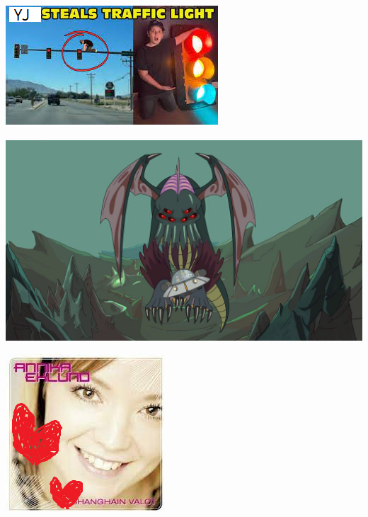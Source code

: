 \documentclass[10pt, a4paper]{article}
\begin{document}
\begin{multicols}{2}
\begin{flushleft}
\hfill\hfill\hfill\hspace*{-1cm}\includegraphics[scale=1.4]{kuvat/yj-steal-light.png}

\pagebreak








\includegraphics[scale=0.085]{kuvat/cthulhu parempi.jpg}
\pagebreak



\columnbreak


\hspace*{-3cm}\includegraphics[scale=1.3]{kuvat/annika-eriksson.png}

\pagebreak


\end{flushleft}
\end{multicols}
\end{document}
